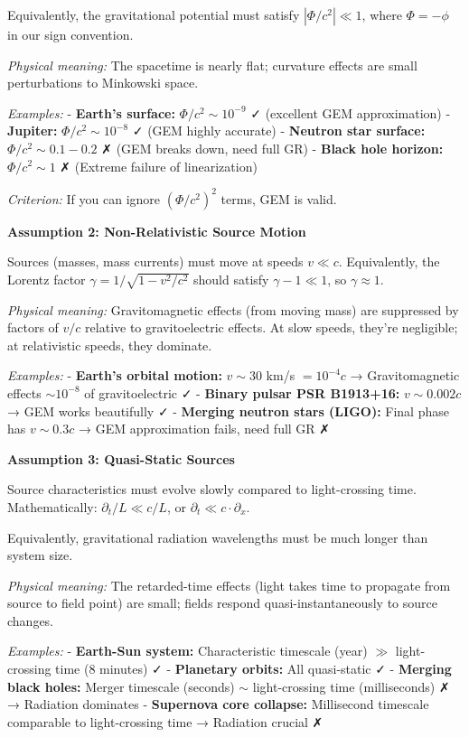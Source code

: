\documentclass[
]{article}
\begin{document}
Equivalently, the gravitational potential must satisfy
\(|\Phi/c^2| \ll 1\), where \(\Phi = -\phi\) in our sign convention.

\emph{Physical meaning:} The spacetime is nearly flat; curvature effects
are small perturbations to Minkowski space.

\emph{Examples:} - \textbf{Earth's surface:} \(\Phi/c^2 \sim 10^{-9}\) ✓
(excellent GEM approximation) - \textbf{Jupiter:}
\(\Phi/c^2 \sim 10^{-8}\) ✓ (GEM highly accurate) - \textbf{Neutron star
surface:} \(\Phi/c^2 \sim 0.1 - 0.2\) ✗ (GEM breaks down, need full GR)
- \textbf{Black hole horizon:} \(\Phi/c^2 \sim 1\) ✗ (Extreme failure of
linearization)

\emph{Criterion:} If you can ignore \((\Phi/c^2)^2\) terms, GEM is
valid.

\textbf{Assumption 2: Non-Relativistic Source Motion}

Sources (masses, mass currents) must move at speeds \(v \ll c\).
Equivalently, the Lorentz factor \(\gamma = 1/\sqrt{1 - v^2/c^2}\)
should satisfy \(\gamma - 1 \ll 1\), so \(\gamma \approx 1\).

\emph{Physical meaning:} Gravitomagnetic effects (from moving mass) are
suppressed by factors of \(v/c\) relative to gravitoelectric effects. At
slow speeds, they're negligible; at relativistic speeds, they dominate.

\emph{Examples:} - \textbf{Earth's orbital motion:} \(v \sim 30\) km/s
\(= 10^{-4} c\) → Gravitomagnetic effects \(\sim 10^{-8}\) of
gravitoelectric ✓ - \textbf{Binary pulsar PSR B1913+16:}
\(v \sim 0.002 c\) → GEM works beautifully ✓ - \textbf{Merging neutron
stars (LIGO):} Final phase has \(v \sim 0.3 c\) → GEM approximation
fails, need full GR ✗

\textbf{Assumption 3: Quasi-Static Sources}

Source characteristics must evolve slowly compared to light-crossing
time. Mathematically: \(\partial_t / L \ll c/L\), or
\(\partial_t \ll c \cdot \partial_x\).

Equivalently, gravitational radiation wavelengths must be much longer
than system size.

\emph{Physical meaning:} The retarded-time effects (light takes time to
propagate from source to field point) are small; fields respond
quasi-instantaneously to source changes.

\emph{Examples:} - \textbf{Earth-Sun system:} Characteristic timescale
(year) \(\gg\) light-crossing time (8 minutes) ✓ - \textbf{Planetary
orbits:} All quasi-static ✓ - \textbf{Merging black holes:} Merger
timescale (seconds) \(\sim\) light-crossing time (milliseconds) ✗ →
Radiation dominates - \textbf{Supernova core collapse:} Millisecond
timescale comparable to light-crossing time → Radiation crucial ✗
\end{document}
